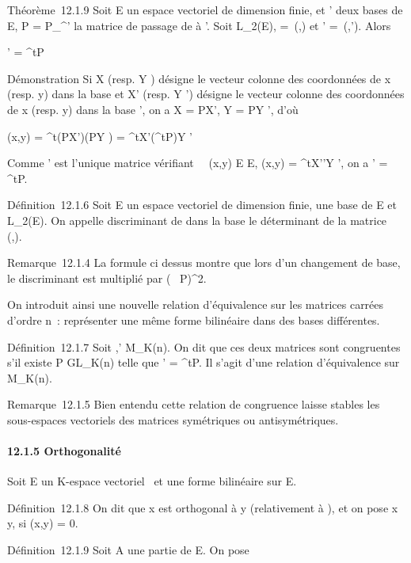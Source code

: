 \documentclass[]{article}
\begin{document}
Théorème~12.1.9 Soit E un espace vectoriel de dimension finie,  et '
deux bases de E, P = P\_^' la matrice de passage de  à
'. Soit \phi \in L\_2(E), \Omega =\
\mathrmMat (\phi,) et \Omega' =\
\mathrmMat (\phi,'). Alors

\Omega' = ^tP\OmegaP

Démonstration Si X (resp. Y ) désigne le vecteur colonne des coordonnées
de x (resp. y) dans la base  et X' (resp. Y ') désigne le vecteur
colonne des coordonnées de x (resp. y) dans la base \mathcal{E}', on a X = PX', Y
= PY ', d'où

\phi(x,y) = ^t(PX')\Omega(PY ) = ^tX'(^tP\OmegaP)Y '

Comme \Omega' est l'unique matrice vérifiant \forall~~(x,y)
\in E \times E, \phi(x,y) = ^tX'\Omega'Y ', on a \Omega' = ^tP\OmegaP.

Définition~12.1.6 Soit E un espace vectoriel de dimension finie,  une
base de E et \phi \in L\_2(E). On appelle discriminant de \phi dans la
base \mathcal{E} le déterminant de la matrice
\mathrmMat~ (\phi,\mathcal{E}).

Remarque~12.1.4 La formule ci dessus montre que lors d'un changement de
base, le discriminant est multiplié par
(\mathrm{det}~
P)^2.

On introduit ainsi une nouvelle relation d'équivalence sur les matrices
carrées d'ordre n~: représenter une même forme bilinéaire dans des bases
différentes.

Définition~12.1.7 Soit \Omega,\Omega' \in M\_K(n). On dit que ces deux
matrices sont congruentes s'il existe P \in GL\_K(n) telle que \Omega'
= ^tP\OmegaP. Il s'agit d'une relation d'équivalence sur
M\_K(n).

Remarque~12.1.5 Bien entendu cette relation de congruence laisse stables
les sous-espaces vectoriels des matrices symétriques ou antisymétriques.

\paragraph{12.1.5 Orthogonalité}

Soit E un K-espace vectoriel ~et \phi une forme bilinéaire sur E.

Définition~12.1.8 On dit que x est orthogonal à y (relativement à \phi), et
on pose x \bot y, si \phi(x,y) = 0.

Définition~12.1.9 Soit A une partie de E. On pose
\end{document}
